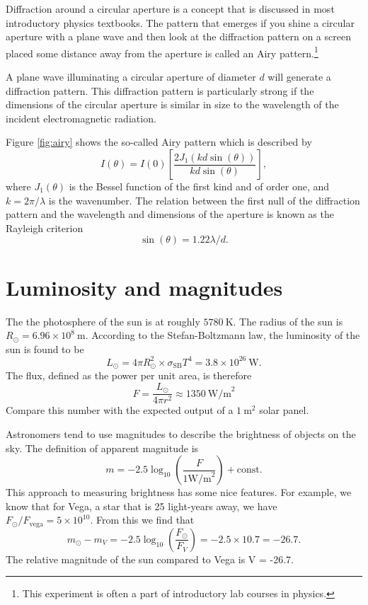 \documentclass[a4paper,12pt]{article}
\theoremstyle{remark}
\newcommand{\mrm}[1]{\mathrm{#1}}
\renewcommand{\=}[1]{\stackrel{#1}{=}} %
\theoremstyle{plain}
\theoremstyle{definition}
\begin{document}
Diffraction around a circular aperture is a concept that is discussed in most introductory physics textbooks. The pattern that emerges if you shine a circular aperture with a plane wave and then look at the diffraction pattern on a screen placed some distance away from the aperture is called an Airy pattern.\footnote{This experiment is often a part of introductory lab courses in physics.}

A plane wave illuminating a circular aperture of diameter $d$ will generate a diffraction pattern. This diffraction pattern is particularly strong if the dimensions of the circular aperture is similar in size to the wavelength of the incident electromagnetic radiation.

Figure \ref{fig:airy} shows the so-called Airy pattern which is described by 
\begin{equation}
I(\theta) = I(0) \left[ \frac{2J_1(kd\sin(\theta))}{kd\sin(\theta)} \right],
\end{equation}
where $J_1(\theta)$ is the Bessel function of the first kind and of order one, and $k = 2\pi/\lambda$ is the wavenumber. The relation between the first null of the diffraction pattern and the wavelength and dimensions of the aperture is known as the Rayleigh criterion
\begin{equation}
\sin (\theta) = 1.22 \lambda /d.
\end{equation}

\section{Luminosity and magnitudes}
The the photosphere of the sun is at roughly $5780 \:\mrm{K}$. The radius of the sun is $R_\odot = 6.96 \times 10^{8} \:\mrm{m}$. According to the Stefan-Boltzmann law, the luminosity of the sun is found to be
\begin{equation}
L _\odot = 4\pi R_\odot ^{2} \times \sigma _\mrm{SB} T^{4} = 3.8 \times 10^{26} \:\mrm{W}.
\end{equation}
The flux, defined as the power per unit area, is therefore
\begin{equation}
F = \frac{L_\odot}{4\pi r^{2}} \approx 1350 \:\mrm{W/m}^{2}
\end{equation}
Compare this number with the expected output of a $1 \:\mrm{m}^{2}$ solar panel.

Astronomers tend to use magnitudes to describe the brightness of objects on the sky. The definition of apparent magnitude is 
\begin{equation}
m = -2.5 \log _{10} \left( \frac{F}{1 \mrm{W/m}^{2}} \right) + \mrm{const}.
\end{equation}
This approach to measuring brightness has some nice features. For example, we know that for Vega, a star that is 25 light-years away, we have $F_\odot / F_\mrm{vega} = 5\times 10^{10}$. From this we find that
\begin{equation}
m_\odot - m_V = -2.5 \log _{10} \left( \frac{F_\odot}{F_V} \right) = -2.5 \times 10.7 = -26.7.
\end{equation}
The relative magnitude of the sun compared to Vega is V = -26.7. 
\end{document}
